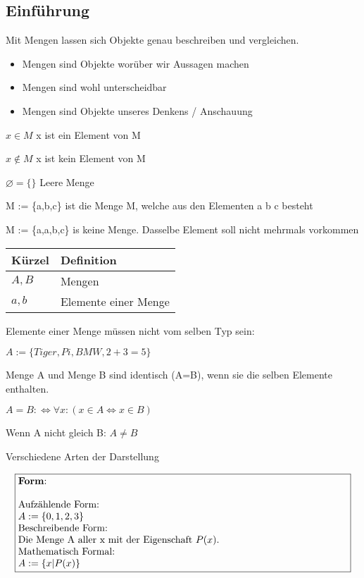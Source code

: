 \documentclass[../gruppenarbeit_1.tex]{subfiles}
\begin{document}
\subsection{Einführung}
Mit Mengen lassen sich Objekte genau beschreiben und vergleichen.

\begin{itemize}
    \item Mengen sind Objekte worüber wir Aussagen machen
    \item Mengen sind wohl unterscheidbar
    \item Mengen sind Objekte unseres Denkens / Anschauung
\end{itemize}

$x \in M$
x ist ein Element von M

$x \notin M$
x ist kein Element von M

$\varnothing = \{\}$
Leere Menge


M := \{a,b,c\}
ist die Menge M, welche aus den Elementen a b c besteht

M := \{a,a,b,c\}
is keine Menge. Dasselbe Element soll nicht mehrmals vorkommen

\def\arraystretch{1.5}
\begin{table}[ht]
\begin{tabular}[t]{ll}
\hline
  Kürzel & Definition\\
\hline
  $A, B$ & Mengen\\
  $a, b$ & Elemente einer Menge\\
\hline
\end{tabular}
\end{table}

Elemente einer Menge müssen nicht vom selben Typ sein:

$A := \{Tiger, Pi, BMW, 2+3=5\}$

Menge A und Menge B sind identisch (A=B), wenn sie die selben Elemente enthalten.

$A=B : \iff \forall x : (x \in A \iff x \in B)$

Wenn A nicht gleich B: $A \ne B$

Verschiedene Arten der Darstellung

\begin{align}
    \fbox{\begin{minipage}{11.8cm}
      \textbf{Form}:\\
      \\
      Aufzählende Form:\\
      $A := \{0,1,2,3\}$\\
      Beschreibende Form:\\
      Die Menge A aller x mit der Eigenschaft $P(x)$.\\
      Mathematisch Formal:\\
      $A := \{x | P(x)\}$
    \end{minipage}}
\end{align}
\end{document}
